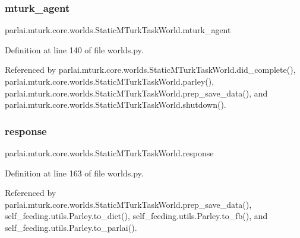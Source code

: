 \mbox{\label{classparlai_1_1mturk_1_1core_1_1worlds_1_1StaticMTurkTaskWorld_a25d8cc71893b0b67169cba15f142b1bc}} 
\subsubsection{\texorpdfstring{mturk\+\_\+agent}{mturk\_agent}}
{\footnotesize\ttfamily parlai.\+mturk.\+core.\+worlds.\+Static\+M\+Turk\+Task\+World.\+mturk\+\_\+agent}



Definition at line 140 of file worlds.\+py.



Referenced by parlai.\+mturk.\+core.\+worlds.\+Static\+M\+Turk\+Task\+World.\+did\+\_\+complete(), parlai.\+mturk.\+core.\+worlds.\+Static\+M\+Turk\+Task\+World.\+parley(), parlai.\+mturk.\+core.\+worlds.\+Static\+M\+Turk\+Task\+World.\+prep\+\_\+save\+\_\+data(), and parlai.\+mturk.\+core.\+worlds.\+Static\+M\+Turk\+Task\+World.\+shutdown().

\mbox{\label{classparlai_1_1mturk_1_1core_1_1worlds_1_1StaticMTurkTaskWorld_af05fea586c5e73130cb159f6486c1855}} 
\subsubsection{\texorpdfstring{response}{response}}
{\footnotesize\ttfamily parlai.\+mturk.\+core.\+worlds.\+Static\+M\+Turk\+Task\+World.\+response}



Definition at line 163 of file worlds.\+py.



Referenced by parlai.\+mturk.\+core.\+worlds.\+Static\+M\+Turk\+Task\+World.\+prep\+\_\+save\+\_\+data(), self\+\_\+feeding.\+utils.\+Parley.\+to\+\_\+dict(), self\+\_\+feeding.\+utils.\+Parley.\+to\+\_\+fb(), and self\+\_\+feeding.\+utils.\+Parley.\+to\+\_\+parlai().

